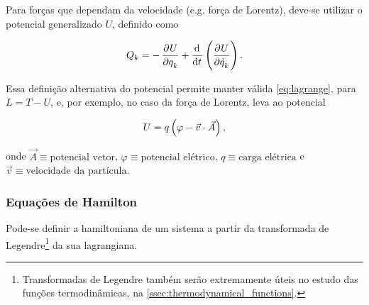 Para forças que dependam da velocidade (e.g. força de Lorentz), deve-se utilizar
o potencial generalizado $U$, definido como

\begin{equation*}
    Q_k = - \dpd{U}{q_k} + \dod{}{t} \del{\dpd{U}{\dot q_k}} \text{.}
\end{equation*}

Essa definição alternativa do potencial permite manter válida
\autoref{eq:lagrange}, para $L = T - U$, e, por exemplo, no caso da força de
Lorentz, leva ao potencial

\begin{equation*}
    U = q \del{\varphi - {\vec v} \cdot {\vec A}} \text{,}
\end{equation*}

onde $\vec A \equiv \text{potencial vetor}$, $\varphi \equiv \text{potencial
elétrico}$, $q \equiv \text{carga elétrica}$ e $\vec v \equiv \text{velocidade
da partícula}$.

\subsubsection{Equações de Hamilton}
\label{sssec:hamilton}

Pode-se definir a hamiltoniana de um sistema a partir da transformada de
Legendre\footnote{Transformadas de Legendre também serão extremamente úteis no
estudo das funções termodinâmicas, na \autoref{ssec:thermodynamical_functions}.}
da sua lagrangiana.


